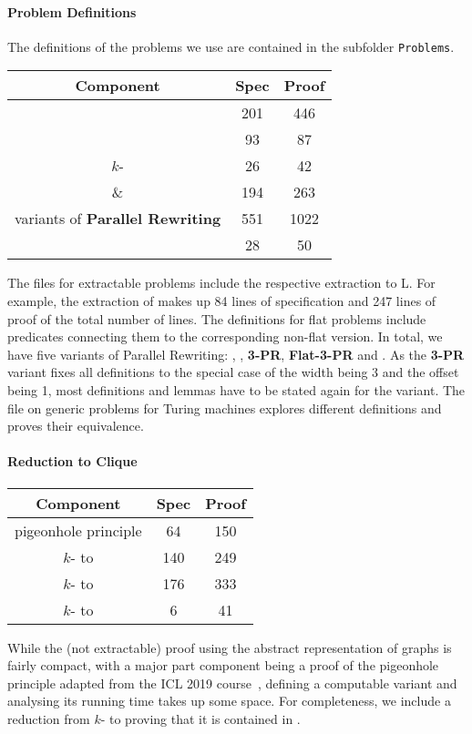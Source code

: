 \paragraph{Problem Definitions}
The definitions of the problems we use are contained in the subfolder \texttt{Problems}. 
\begin{center}
  \begin{tabular}{ccc}
    Component & Spec & Proof \\
    \midrule
    \SAT{} & 201 & 446 \\
    \fsat{} & 93 & 87 \\
    $k$-\SAT{} & 26 & 42 \\
    \Clique{} \& \FlatClique{} & 194 & 263 \\
    variants of \textbf{Parallel Rewriting} & 551 & 1022 \\
    \gennp{} & 28 & 50 \\
  \end{tabular}
\end{center}
The files for extractable problems include the respective extraction to L.
For example, the extraction of \SAT{} makes up 84 lines of specification and 247 lines of proof of the total number of lines.
The definitions for flat problems include predicates connecting them to the corresponding non-flat version. 
In total, we have five variants of Parallel Rewriting: \PR{}, \FlatPR{}, \textbf{3-PR}, \textbf{Flat-3-PR} and \BPR{}. As the \textbf{3-PR} variant fixes all definitions to the special case of the width being 3 and the offset being 1, most definitions and lemmas have to be stated again for the variant. 
The file on generic problems for Turing machines explores different definitions and proves their equivalence. 

\paragraph{Reduction to Clique}
\begin{center}
  \begin{tabular}{ccc}
    Component & Spec & Proof \\
    \midrule
    pigeonhole principle & 64 & 150 \\
    $k$-\SAT{} to \Clique{} & 140 & 249 \\
    $k$-\SAT{} to \FlatClique{} & 176 & 333 \\
    $k$-\SAT{} to \SAT{} & 6 & 41 
  \end{tabular}
\end{center}
While the (not extractable) proof using the abstract representation of graphs is fairly compact, with a major part component being a proof of the pigeonhole principle adapted from the ICL 2019 course~\cite{icl_coq}, defining a computable variant and analysing its running time takes up some space. 
For completeness, we include a reduction from $k$-\SAT{} to \SAT{} proving that it is contained in \NP{}. 

